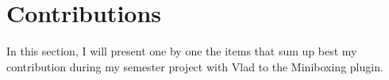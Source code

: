 \section{Contributions}
\label{sec:contrib}

In this section, I will present one by one the items that sum up best my contribution during my semester project with Vlad to the Miniboxing plugin.


